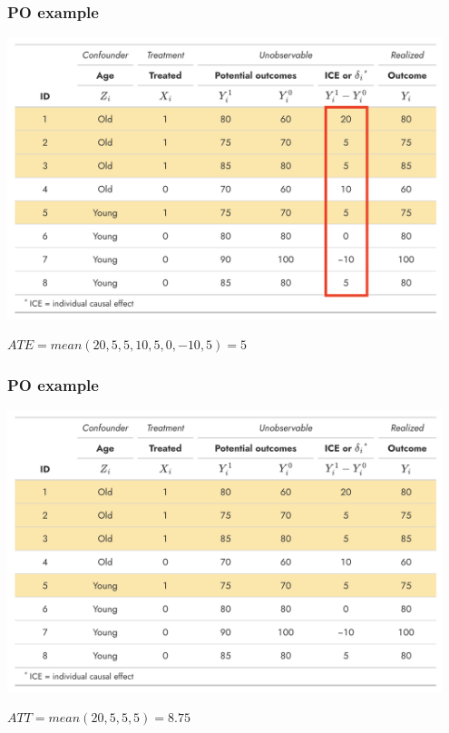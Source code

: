 \documentclass[aspectratio=43]{beamer}
\begin{document}
\begin{frame}
\frametitle{PO example}
\centering

\includegraphics[width = 0.95\textwidth]{../img/po_table_ate}

$ATE = mean(20, 5, 5, 10, 5, 0, -10, 5) = 5$
  
\end{frame}

\begin{frame}
\frametitle{PO example}
\centering

\includegraphics[width = 0.95\textwidth]{../img/po_table_att}

$ATT = mean(20, 5, 5, 5) = 8.75$
  
\end{frame}
\end{document}
